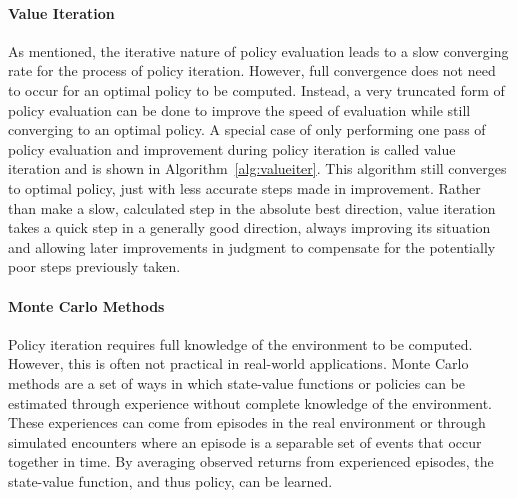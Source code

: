 

\paragraph*{Value Iteration}

As mentioned,
the iterative nature of policy evaluation leads to a slow converging rate
for the process of policy iteration.
%
However,
full convergence does not need to occur for an optimal policy to be computed.
%
Instead,
a very truncated form of policy evaluation can be done to improve the speed
of evaluation while still converging to an optimal policy.
%
A special case of only performing one pass of policy evaluation and improvement
during policy iteration is called value iteration
and is shown in Algorithm~\ref{alg:valueiter}. 
%
This algorithm still converges to optimal policy,
just with less accurate steps made in improvement.
%
Rather than make a slow, calculated step in the absolute best direction,
value iteration takes a quick step in a generally good direction,
always improving its situation and
allowing later improvements in judgment to compensate for the potentially poor
steps previously taken.



\paragraph*{Monte Carlo Methods}


Policy iteration requires full knowledge of the environment to be computed.
%
However,
this is often not practical in real-world applications.
%
Monte Carlo methods are a set of ways in which
state-value functions or policies can be estimated through experience without
complete knowledge of the environment.
%
These experiences can come from episodes in the real environment
or through simulated encounters
where an episode is a separable set of events that occur together in
time.
%
By averaging observed returns from experienced episodes,
the state-value function,
and thus policy,
can be learned.

